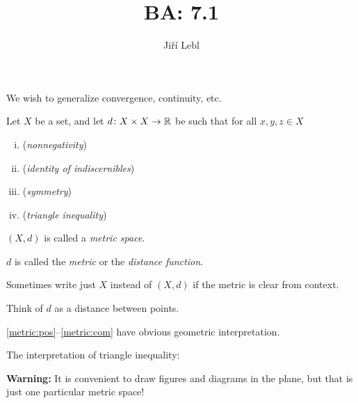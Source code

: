 \documentclass[10pt,aspectratio=149]{beamer}
\author{Ji\v{r}\'i Lebl}
\institute[OSU]{%
Departemento pri Matematiko de Oklahoma {\^S}tata Universitato}
\title{BA: 7.1}
\date{}
\begin{document}
\begin{frame}
\titlepage
\end{frame}

\begin{frame}
We wish to generalize convergence, continuity, etc.

\pause

\begin{definition}
Let $X$ be a set, and let
$d \colon X \times X \to {\mathbb{R}}$
be such that for all $x,y,z \in X$
\begin{enumerate}[(i)]
%
\item \label{metric:pos}
\pause
{}
(\emph{nonnegativity})
%
\item \label{metric:zero}
\pause
{}
(\emph{identity of indiscernibles})
%
\item \label{metric:com}
\pause
{} 
(\emph{symmetry})
%
\item \label{metric:triang}
\pause
{}
(\emph{triangle inequality})
\end{enumerate}

\pause
\medskip

$(X,d)$ is called a \emph{metric space}.

\pause
\medskip
  
$d$ is called the \emph{metric} or the \emph{distance function}.

\pause
\medskip

Sometimes write just $X$ instead of $(X,d)$
if the metric is clear from context.
\end{definition}

\pause
Think of $d$ as a distance between points.

\pause
\medskip

\eqref{metric:pos}--\eqref{metric:com} have obvious geometric
interpretation.

\end{frame}

\begin{frame}

The interpretation of triangle inequality:

\medskip

\begin{center}
\end{center}

\pause
\medskip

\textbf{Warning:}
It is convenient to draw figures and diagrams in the plane,
but that is just one particular metric space!

\end{frame}
\end{document}
